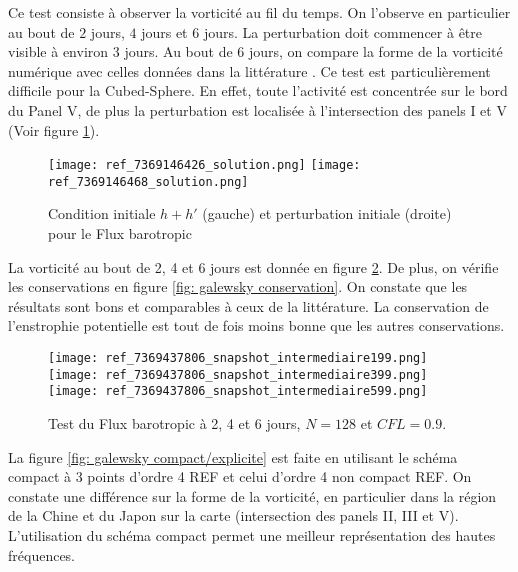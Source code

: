 Ce test consiste à observer la vorticité au fil du temps. On l'observe en particulier au bout de $2$ jours, $4$ jours et $6$ jours. La perturbation doit commencer à être visible à environ 3 jours. Au bout de 6 jours, on compare la forme de la vorticité numérique avec celles données dans la littérature \cite{Galewsky2004, Chen2008}. Ce test est particulièrement difficile pour la Cubed-Sphere. En effet, toute l'activité est concentrée sur le bord du Panel V, de plus la perturbation est localisée à l'intersection des panels I et V (Voir figure \ref{fig: initiale et perturbation Galewsky}).

\begin{figure}[htbp]
\begin{center}
\texttt{[image: ref\_7369146426\_solution.png]}
\texttt{[image: ref\_7369146468\_solution.png]}
\end{center}
\caption{Condition initiale $h+h'$ (gauche) et perturbation initiale (droite) pour le Flux barotropic \cite{Galewsky2004}}
\label{fig: initiale et perturbation Galewsky}
\end{figure}

La vorticité au bout de 2, 4 et 6 jours est donnée en figure \ref{fig: galewsky 246}. De plus, on vérifie les conservations en figure \ref{fig: galewsky conservation}. On constate que les résultats sont bons et comparables à ceux de la littérature. La conservation de l'enstrophie potentielle est tout de fois moins bonne que les autres conservations.

\begin{figure}[htbp]
\begin{center}
\texttt{[image: ref\_7369437806\_snapshot\_intermediaire199.png]}
\texttt{[image: ref\_7369437806\_snapshot\_intermediaire399.png]}
\texttt{[image: ref\_7369437806\_snapshot\_intermediaire599.png]}
\end{center}
\caption{Test du Flux barotropic \cite{Galewsky2004} à 2, 4 et 6 jours, $N=128$ et $CFL=0.9$.}
\label{fig: galewsky 246}
\end{figure}

La figure \ref{fig: galewsky compact/explicite} est faite en utilisant le schéma compact à 3 points d'ordre 4 REF et celui d'ordre 4 non compact REF. On constate une différence sur la forme de la vorticité, en particulier dans la région de la Chine et du Japon sur la carte (intersection des panels II, III et V). L'utilisation du schéma compact permet une meilleur représentation des hautes fréquences.

